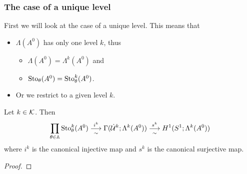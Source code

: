 \subsubsection{The case of a unique level}
\begin{comment}
  \cite[II.3.2]{Loday1994}
\end{comment}
First we will look at the case of a unique level. This means that
\begin{itemize}
  \item $\Lambda(A^0)$ has only one level $k$, thus
    \begin{itemize}
      \item $\Lambda(A^0)=\Lambda^k(A^0)$ and
      \item $\operatorname{Sto}_\theta(A^0)=\operatorname{Sto}_\theta^k(A^0)$.
    \end{itemize}
  \item Or we restrict to a given level $k$.
\end{itemize}
\begin{lem}
  Let $k\in\mathcal{K}$. Then
  \[
    \underset{\theta\in\mathbb{A}}\prod\operatorname{Sto}_\theta^k(A^0)
    \underset{\sim}{\overset{i^k}{\longrightarrow}}
    \Gamma(\dot{\mathcal{U}}^k;\Lambda^k(A^0))
    \underset{\sim}{\overset{s^k}{\longrightarrow}}
    H^1(S^1;\Lambda^k(A^0))
  \]
  where $i^k$ is the canonical injective map and $s^k$ is the canonical
  surjective map.
\end{lem}
\begin{proof}
  \TODO{}
\end{proof}

